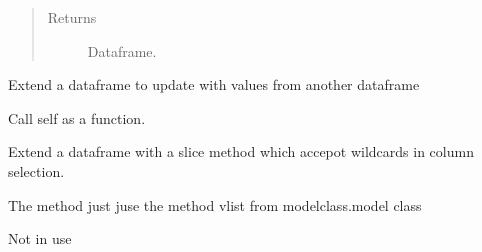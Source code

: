 \documentclass[letterpaper,10pt,english]{sphinxmanual}
\begin{document}
\begin{fulllineitems}
\begin{fulllineitems}
\begin{quote}
\begin{description}
\begin{itemize}
\end{itemize}

\item[{Returns}] \leavevmode
\sphinxAtStartPar
Dataframe.

\end{description}\end{quote}

\end{fulllineitems}


\end{fulllineitems}


\begin{fulllineitems}
\label{\detokenize{index:modelmf.mfupdate}}
\pysigstartsignatures
{}
\pysigstopsignatures
\sphinxAtStartPar
Extend a dataframe to update with values from another dataframe

\begin{fulllineitems}
\label{\detokenize{index:modelmf.mfupdate.__call__}}
\pysigstartsignatures
{}
\pysigstopsignatures
\sphinxAtStartPar
Call self as a function.

\end{fulllineitems}


\end{fulllineitems}


\begin{fulllineitems}
\label{\detokenize{index:modelmf.ibloc}}
\pysigstartsignatures
{}
\pysigstopsignatures
\sphinxAtStartPar
Extend a dataframe with a slice method which accepot wildcards in column selection.

\sphinxAtStartPar
The method just juse the method vlist from modelclass.model class

\begin{fulllineitems}
\label{\detokenize{index:modelmf.ibloc.__call__}}
\pysigstartsignatures
{}
\pysigstopsignatures
\sphinxAtStartPar
Not in use

\end{fulllineitems}


\end{fulllineitems}
\end{document}
